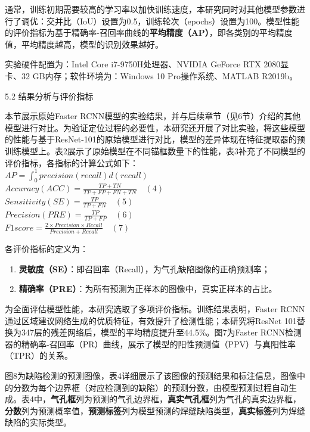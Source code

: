 通常，训练初期需要较高的学习率以加快训练速度，本研究同时对其他模型参数进行了调优：交并比（IoU）设置为0.5，训练轮次（epochs）设置为100。模型性能的评价指标为基于精确率-召回率曲线的\textbf{平均精度（AP）}，即各类别的平均精度值，平均精度越高，模型的识别效果越好。

实验硬件配置为：Intel Core i7-9750H处理器、NVIDIA GeForce RTX
2080显卡、32 GB内存；软件环境为：Windows 10 Pro操作系统、MATLAB R2019b。

5.2 结果分析与评价指标

本节展示原始Faster
RCNN模型的实验结果，并与后续章节（见6节）介绍的其他模型进行对比。为验证定位过程的必要性，本研究还开展了对比实验，将这些模型的性能与基于ResNet-101的原始模型进行对比，模型的差异体现在特征提取器的预训练模型上。表2展示了原始模型在不同锚框数量下的性能，表3补充了不同模型的评价指标，各指标的计算公式如下：\\
\(AP=\int_{0}^{1} precision ( recall ) d( recall )\)\\
\(Accuracy (A C C)=\frac{T P+T N}{T P+F P+F N+T N} \quad (4)\)\\
\(Sensitivity (S E)=\frac{T P}{T P+F N} \quad (5)\)\\
\(Precision (P R E)=\frac{T P}{T P+F P} \quad (6)\)\\
\(F1 score =\frac{2 × Precision × Recall }{ Precision + Recall } \quad (7)\)

各评价指标的定义为：

\begin{enumerate}
	\def\labelenumi{\arabic{enumi}.}
	\item
	\textbf{灵敏度（SE）}：即召回率（Recall），为气孔缺陷图像的正确预测率；
	\item
	\textbf{精确率（PRE）}：为所有预测为正样本的图像中，真实正样本的占比。
\end{enumerate}

为全面评估模型性能，本研究选取了多项评价指标。训练结果表明，Faster
RCNN通过区域建议网络生成的优质特征，有效提升了检测性能；本研究将ResNet
101替换为347层的残差网络后，模型的平均精度提升至44.5\%。图7为Faster
RCNN检测器的精确率-召回率（PR）曲线，展示了模型的阳性预测值（PPV）与真阳性率（TPR）的关系。

图8为缺陷检测的预测图像，表4详细展示了该图像的预测结果和标注信息，图像中的分数为每个边界框（对应检测到的缺陷）的预测分数，由模型预测过程自动生成。表4中，\textbf{气孔框}列为预测的气孔边界框，\textbf{真实气孔框}列为气孔的真实边界框，\textbf{分数}列为预测概率值，\textbf{预测标签}列为模型预测的焊缝缺陷类型，\textbf{真实标签}列为焊缝缺陷的实际类型。

